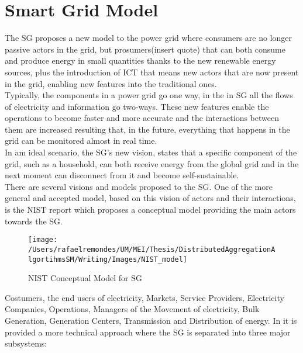 \section{Smart Grid Model}
 The  SG  proposes a new model to the power grid where consumers are no longer passive actors in the grid, but prosumers(insert quote) that can both consume and produce energy in small quantities thanks to the new renewable energy sources, plus the introduction of ICT that means new actors that are now present in the grid, enabling new features into the traditional ones.\\
 Typically, the components in a power grid go one way, in the in SG  all the flows of electricity and information go two-ways.  These new features enable the operations to become  faster and more accurate and the interactions between them  are increased resulting that, in the future, everything that happens in the grid can be monitored almost in real time.\\
 In am ideal scenario, the SG's new vision, states that a specific component of the grid, such as a household, can both receive energy from the global grid and in the next moment can disconnect from it and become self-sustainable. \\
There are several visions and models proposed to the SG. One of the more general and accepted model, based on this vision of actors and their interactions, is  the NIST report \cite{government2011nist} which proposes a conceptual model providing the main actors towards the SG.
\begin{figure}[h]
\centering
\texttt{[image: /Users/rafaelremondes/UM/MEI/Thesis/DistributedAggregationAlgortihmsSM/Writing/Images/NIST\_model]}
\caption{\label{fig:NIST_model} NIST Conceptual Model for SG}
\end{figure}
Costumers, the end users of electricity, Markets, Service Providers, Electricity Companies, Operations, Managers of the Movement of electricity, Bulk Generation, Generation Centers, Transmission and Distribution of energy. 
In \cite{journals/comsur/FangMXY12} it is provided a more technical approach where the SG is separated into three major subsystems:
